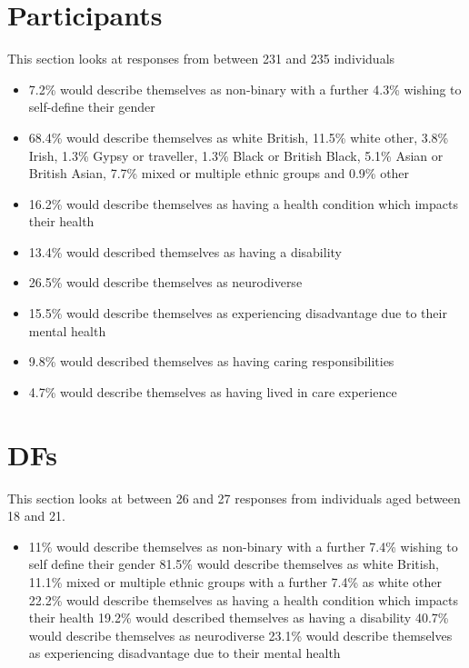 \section{Participants}
This section looks at responses from between 231 and 235 individuals
\begin{itemize}
    \item 7.2\% would describe themselves as non-binary with a further 4.3\% wishing to self-define their gender
    \item 68.4\% would describe themselves as white British, 11.5\% white other, 3.8\% Irish, 1.3\% Gypsy or traveller, 1.3\% Black or British Black, 5.1\% Asian or British Asian, 7.7\% mixed or multiple ethnic groups and 0.9\% other
    \item 16.2\% would describe themselves as having a health condition which impacts their health
    \item 13.4\% would described themselves as having a disability
    \item 26.5\% would describe themselves as neurodiverse
    \item 15.5\% would describe themselves as experiencing disadvantage due to their mental health
    \item 9.8\% would described themselves as having caring responsibilities
    \item 4.7\% would describe themselves as having lived in care experience
\end{itemize}

\section{DFs}
This section looks at between 26 and 27 responses from individuals aged between 18 and 21.
\begin{itemize}
    \item 11\% would describe themselves as non-binary with a further 7.4\% wishing to self define their gender
    81.5\% would describe themselves as white British, 11.1\% mixed or multiple ethnic groups with a further 7.4\% as white other
    22.2\% would describe themselves as having a health condition which impacts their health
    19.2\% would described themselves as having a disability
    40.7\% would describe themselves as neurodiverse
    23.1\% would describe themselves as experiencing disadvantage due to their mental health
\end{itemize}

